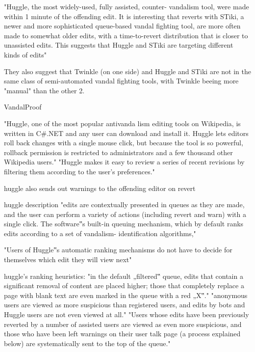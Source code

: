 \cite{GeiHal2013}
"Huggle, the most widely-used, fully assisted, counter-
vandalism tool, were made within 1 minute of the
offending edit. It is interesting that reverts with STiki, a
newer and more sophisticated queue-based vandal fighting
tool, are more often made to somewhat older edits, with a
time-to-revert distribution that is closer to unassisted edits.
This suggests that Huggle and STiki are targeting different
kinds of edits"

They also suggest that Twinkle (on one side) and Huggle and STiki are not in the same class of semi-automated vandal fighting tools, with Twinkle beeing more "manual" than the other 2.

VandalProof~\cite{HalRied2012}

"Huggle, one of the most popular
antivanda lism editing tools on
Wikipedia, is written in C#.NET
and any user can download and
install it. Huggle lets editors roll back
changes with a single mouse click,
but because the tool is so powerful,
rollback permission is restricted to
administrators and a few thousand
other Wikipedia users."
"Huggle makes it easy to review
a series of recent revisions by
filtering them according to the
user’s preferences."~\cite{HalRied2012}

huggle also sends out warnings to the offending editor on revert~\cite{HalRied2012}

\cite{GeiRib2010}
huggle description
"edits are contextually
presented in queues as they are made, and the user can
perform a variety of actions (including revert and warn) with
a single click. The software‟s built-in queuing mechanism,
which by default ranks edits according to a set of vandalism-
identification algorithms,"

"Users of Huggle‟s automatic
ranking mechanisms do not have to decide for themselves
which edit they will view next"

huggle's ranking heuristics:
"in the default „filtered‟ queue, edits that contain a significant removal of content are placed
higher; those that completely replace a page with blank text
are even marked in the queue with a red „X‟."
"anonymous users are viewed as more suspicious than
registered users, and edits by bots and Huggle users are not
even viewed at all."
"Users whose edits have been previously
reverted by a number of assisted users are viewed as even
more suspicious, and those who have been left warnings on
their user talk page (a process explained below) are
systematically sent to the top of the queue."

